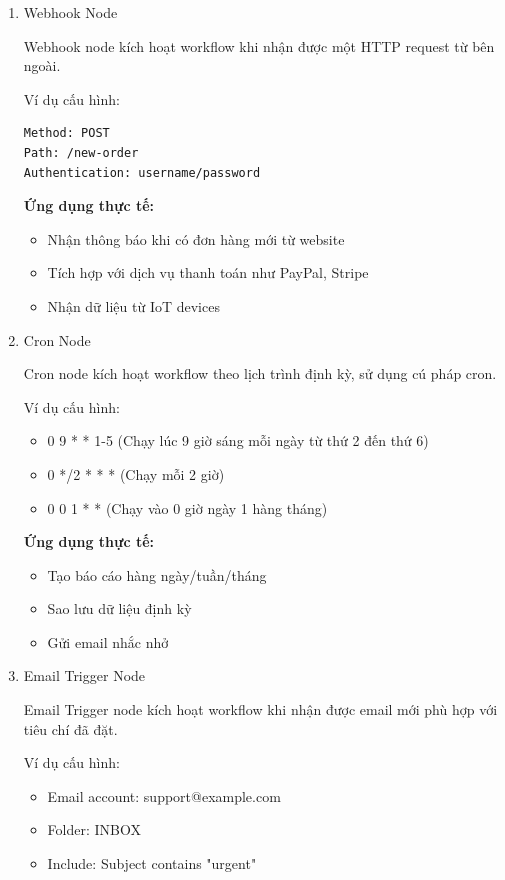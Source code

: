 \begin{enumerate}
    \item Webhook Node

Webhook node kích hoạt workflow khi nhận được một HTTP request từ bên ngoài.

Ví dụ cấu hình:
\begin{lstlisting}
Method: POST
Path: /new-order
Authentication: username/password
\end{lstlisting}

\textbf{Ứng dụng thực tế:}
\begin{itemize}
    \item Nhận thông báo khi có đơn hàng mới từ website
    \item Tích hợp với dịch vụ thanh toán như PayPal, Stripe
    \item Nhận dữ liệu từ IoT devices
\end{itemize}

\item Cron Node

Cron node kích hoạt workflow theo lịch trình định kỳ, sử dụng cú pháp cron.

Ví dụ cấu hình:
\begin{itemize}
    \item 0 9 * * 1-5    (Chạy lúc 9 giờ sáng mỗi ngày từ thứ 2 đến thứ 6)
    \item 0 */2 * * *    (Chạy mỗi 2 giờ)
    \item 0 0 1 * *      (Chạy vào 0 giờ ngày 1 hàng tháng)
\end{itemize}

\textbf{Ứng dụng thực tế:}
\begin{itemize}
    \item Tạo báo cáo hàng ngày/tuần/tháng
    \item Sao lưu dữ liệu định kỳ
    \item Gửi email nhắc nhở
\end{itemize}

\item Email Trigger Node

Email Trigger node kích hoạt workflow khi nhận được email mới phù hợp với tiêu chí đã đặt.

Ví dụ cấu hình:
\begin{itemize}
    \item Email account: support@example.com
    \item Folder: INBOX
    \item Include: Subject contains "urgent"
\end{itemize}


\end{enumerate}
